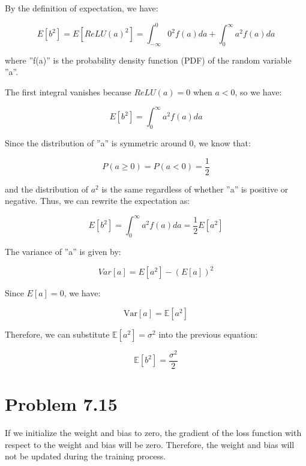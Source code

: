 \documentclass{article}
\begin{document}
By the definition of expectation, we have:

\[
E[b^2]=E[ReLU(a)^2]=\int_{-\infty}^0 0^2f(a)da + \int_0^{\infty} a^2f(a)da
\]

where ''f(a)'' is the probability density function (PDF) of the random variable ''a''.

The first integral vanishes because \(ReLU(a)=0\) when \(a<0\), so we have:

\[
E[b^2]=\int_0^{\infty} a^2f(a)da
\]

Since the distribution of ''a'' is symmetric around 0, we know that:

\[
P(a\geq0)=P(a<0)=\frac{1}{2}
\]

and the distribution of \(a^2\) is the same regardless of whether ''a'' is positive or negative. Thus, we can rewrite the expectation as:

\[
E[b^2]=\int_0^{\infty} a^2f(a)da=\frac{1}{2}E[a^2]
\]

The variance of ''a'' is given by:

\[
Var[a]=E[a^2]-(E[a])^2
\]

Since \(E[a]=0\), we have:

\[
\text{Var}[a] = \mathbb{E}[a^2]
\]

Therefore, we can substitute \(\mathbb{E}[a^2] = \sigma^2\) into the previous equation:

\[
\mathbb{E}[b^2] = \frac{\sigma^2}{2}
\]

\section*{Problem 7.15}
If we initialize the weight and bias to zero, the gradient 
of the loss function with respect to the weight and bias will be zero. 
Therefore, the weight and bias will not be updated during the training process.
\end{document}
